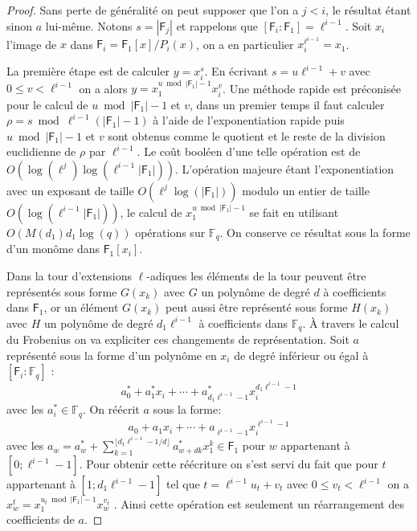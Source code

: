 \documentclass[10pt,a4paper]{book}
\theoremstyle{plain}
\theoremstyle{definition}
\theoremstyle{definition}
\theoremstyle{definition}
\theoremstyle{definition}
\theoremstyle{remark}
\theoremstyle{remark}
\theoremstyle{definition}
\begin{document}
\begin{proof}
Sans perte de généralité on peut supposer que l'on a $j<i$, le résultat étant sinon $a$ lui-même. Notons $s= |\mathsf{F}_j|$ et rappelons que $[\mathsf{F}_i:\mathsf{F}_1]=\ell^{i-1}$. Soit $x_i$ l'image de $x$ dans $\mathsf{F}_i=\mathsf{F}_1[x]/P_i(x)$, on a en particulier $x_i^{\ell^{i-1}}=x_1$.

La première étape est de calculer $y=x_i^s$. En écrivant $s=u\ell^{i-1}+v$ avec $0 \leqslant v < \ell^{i-1}$ on a alors $y=x_1^{u \bmod |\mathsf{F}_1|-1}x_i^v$. 
Une méthode rapide est préconisée pour le calcul de $u \bmod |\mathsf{F}_1|-1$ et $v$, dans un premier temps il faut calculer $\rho=s \bmod \ell^{i-1}(|\mathsf{F}_1|-1)$ à l'aide de l'exponentiation rapide puis $u \bmod |\mathsf{F}_1|-1$ et $v$ sont obtenus comme le quotient et le reste de la division euclidienne   de $\rho$ par $\ell^{i-1}$. Le coût booléen d'une telle opération est de $O(\log(\ell^j)\log(\ell^{i-1}|\mathsf{F}_1|))$. L'opération majeure étant l'exponentiation avec un exposant de taille $O(\ell^{j}\log(|\mathsf{F}_1|))$ modulo un entier de taille $O(\log(\ell^{i-1}|\mathsf{F}_1|))$, le calcul de $x_1^{u \bmod |\mathsf{F}_1|-1}$ se fait en utilisant $O( M(d_1) d_1\log(q))$ opérations sur $\mathbb{F}_q$. On conserve ce résultat sous la forme d'un monôme dans $\mathsf{F}_1[x_i]$. 

Dans la tour d'extensions $\ell$-adiques les éléments de la tour peuvent être représentés sous forme $G(x_k)$ avec $G$ un polynôme de degré $d$ à coefficients dans $\mathsf{F}_1$, or un élément $G(x_k)$ peut aussi être représenté sous forme $H(x_k)$ avec $H$ un polynôme de degré $d_1\ell^{i-1}$ à coefficients dans $\mathbb{F}_q$. \`A travers le calcul du Frobenius on va expliciter ces changements de représentation. Soit $a$ représenté sous la forme d'un polynôme en $x_i$ de degré inférieur ou égal à $[\mathsf{F}_i:\mathbb{F}_q]$ : 
\begin{equation*}
a^*_0+a_1^*x_i+ \cdots + a^*_{d_1\ell^{i-1}-1}x_i^{d_1\ell^{i-1}-1}
\end{equation*}
avec les $a_i^* \in \mathbb{F}_q$. On réécrit $a$ sous la forme:
\begin{equation*}
a_0+a_1x_i+ \cdots + a_{\ell^{i-1}-1}x_i^{\ell^{i-1}-1}
\end{equation*}
avec les $a_w=a_w^* + \sum_{k=1}^{\lfloor d_1\ell^{i-1}-1/d \rfloor}a_{w+dk}^*x_1^k \in \mathsf{F}_1$ pour $w$ appartenant à $[0; \ell^{i-1}-1]$. Pour obtenir cette réécriture on s'est servi du fait que pour $t$ appartenant à $[1; d_1\ell^{i-1}-1]$ tel que $t=\ell^{i-1} u_t+v_t$ avec $0 \leqslant v_t<\ell^{i-1}$ on a $x_w^t=x_1^{u_t \bmod |\mathsf{F}_1|-1}x_w^{v_t}$ . Ainsi cette opération est seulement un réarrangement des coefficients de $a$.


\end{proof}
\end{document}
